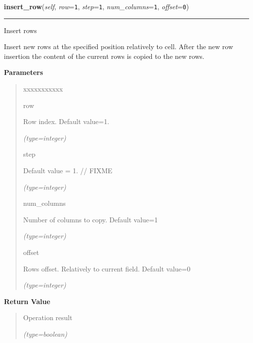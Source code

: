 \hspace{.8\funcindent}\begin{boxedminipage}{\funcwidth}

    \raggedright \textbf{insert\_row}(\textit{self}, \textit{row}={\tt 1}, \textit{step}={\tt 1}, \textit{num\_columns}={\tt 1}, \textit{offset}={\tt 0})

    \vspace{-1.5ex}

    \rule{\textwidth}{0.5\fboxrule}
\setlength{\parskip}{2ex}
    Insert rows

    Insert new rows at the specified position relatively to cell. After the
    new row insertion the content of the current rows is copied to the new 
    rows.

\setlength{\parskip}{1ex}
      \textbf{Parameters}
      \vspace{-1ex}

      \begin{quote}
        \begin{Ventry}{xxxxxxxxxxx}

          \item[row]

          Row index. Default value=1.

            {\it (type=integer)}

          \item[step]

          Default value = 1.    // FIXME

            {\it (type=integer)}

          \item[num\_columns]

          Number of columns to copy. Default value=1

            {\it (type=integer)}

          \item[offset]

          Rows offset. Relatively to current field. Default value=0

            {\it (type=integer)}

        \end{Ventry}

      \end{quote}

      \textbf{Return Value}
    \vspace{-1ex}

      \begin{quote}
      Operation result

      {\it (type=boolean)}

      \end{quote}

    \end{boxedminipage}

